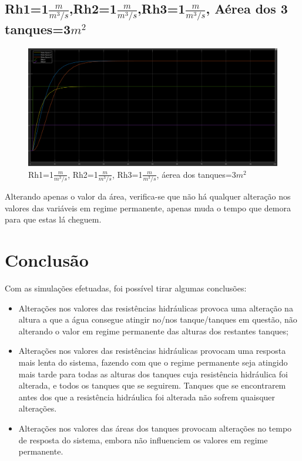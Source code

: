 \documentclass[11pt]{article}
\begin{document}
\subsection{Rh1=1$\frac{m}{m^3/s}$,Rh2=1$\frac{m}{m^3/s}$,Rh3=1$\frac{m}{m^3/s}$, Aérea dos 3 tanques=3$m^2$}
\begin{figure}[!h]
\includegraphics[width=16cm]{A3.png}
\caption{Rh1=1$\frac{m}{m^3/s}$, Rh2=1$\frac{m}{m^3/s}$, Rh3=1$\frac{m}{m^3/s}$, áerea dos tanques=3$m^2$}
\label{fig2.5}
\end{figure}
Alterando apenas o valor da área, verifica-se que não há qualquer alteração nos valores das variáveis em regime permanente, apenas muda o tempo que demora para que estas lá cheguem.
\section{Conclusão}
Com as simulações efetuadas, foi possível tirar algumas conclusões:
\begin{itemize}
\item Alterações nos valores das resistências hidráulicas provoca uma alteração na altura a que a água consegue atingir no/nos tanque/tanques em questão, não alterando o valor em regime permanente das alturas dos restantes tanques;
\item Alterações nos valores das resistências hidráulicas provocam uma resposta mais lenta do sistema, fazendo com que o regime permanente seja atingido mais tarde para todas as alturas dos tanques cuja resistência hidráulica foi alterada, e todos os tanques que se seguirem. Tanques que se encontrarem antes dos que a resistência hidráulica foi alterada não sofrem quaisquer alterações.
\item Alterações nos valores das áreas dos tanques provocam alterações no tempo de resposta do sistema, embora não influenciem os valores em regime permanente.
\end{itemize}
\end{document}
